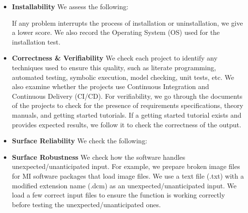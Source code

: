\documentclass[final, 3p, times, authoryear]{elsarticle}
\begin{document}
\begin{itemize}

\item \textbf{Installability} We assess the following: 
If any problem interrupts the process of installation or uninstallation, we give
a lower score. We also record the Operating System (OS) used for the
installation test.

\item \textbf{Correctness \& Verifiability} We check each project to identify
any techniques used to ensure this quality, such as literate programming,
automated testing, symbolic execution, model checking, unit tests, etc. We also
examine whether the projects use Continuous Integration and Continuous Delivery
(CI/CD). For verifiability, we go through the documents of the projects to check
for the presence of requirements specifications, theory manuals, and getting
started tutorials. If a getting started tutorial exists and provides expected
results, we follow it to check the correctness of the output.

\item \textbf{Surface Reliability} We check the following: 

\item \textbf{Surface Robustness} We check how the software handles
unexpected/unanticipated input. For example, we prepare broken image files for
MI software packages that load image files. We use a text file (.txt) with a
modified extension name (.dcm) as an unexpected/unanticipated input. We load a
few correct input files to ensure the function is working correctly before
testing the unexpected/unanticipated ones.


\end{itemize}
\end{document}
